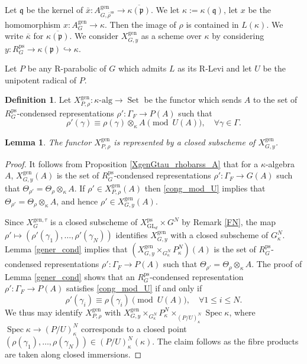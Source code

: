 \documentclass{amsart}
\newtheorem{lem}[prop]{Lemma}
\theoremstyle{definition}
\newtheorem{defi}[prop]{Definition}
\theoremstyle{remark}
\DeclareMathOperator{\GL}{GL}
\DeclareMathOperator{\Spec}{Spec}
\DeclareMathOperator{\Set}{Set}
\newcommand{\pp}{\mathfrak p}
\newcommand{\qq}{\mathfrak{q}}
\newcommand{\alg}{\mathrm{alg}}
\newcommand{\rhobar}{\overline{\rho}}
\newcommand{\ps}{\mathrm{ps}}
\newcommand{\gen}{\mathrm{gen}}
\newcommand{\kappabar}{\overline{\kappa}}
\newcommand{\RpsG}{R^{\ps}_G}
\newcommand{\XpsGLd}{X^{\ps}_{\GL_d}}
\newcommand{\xbar}{\bar{x}}
\newcommand{\rhobarss}{\rhobar^{\mathrm{ss}}}
\newcommand{\hyphen}{\text{-}}
\renewcommand{\xbar}{\bar{x}}
\begin{document}
 Let $\qq$ be the kernel of $\xbar: A^{\gen}_{G, \rhobarss} \rightarrow \overline{\kappa(\pp)}$. We let 
 $\kappa:=\kappa(\qq)$, let $x$ be the homomorphism $x: A^{\gen}_G \rightarrow \kappa$. Then the image of 
 $\rho$ is contained in $L(\kappa)$. 
 We write $\kappabar$ for $\overline{\kappa(\pp)}$. We consider $X^{\gen}_{G, y}$ as a scheme over 
 $\kappa$ by considering $y: R^{\ps}_{G} \rightarrow \kappa(\pp)\hookrightarrow \kappa$.
 
Let $P$ be any R-parabolic of $G$ which admits $L$ as its R-Levi  and let $U$ be the unipotent radical of $P$. 
\begin{defi}\label{def_XgenPrho}  Let $X^{\gen}_{P, \rho}: \kappa\hyphen\alg \to \Set$ be the functor which sends 
$A$ to the set of  $R^{\ps}_{G}$-condensed representations $\rho': \Gamma_F\rightarrow P(A)$ such that 
\begin{equation}\label{cong_mod_U}
\rho'(\gamma)\equiv\rho(\gamma)\otimes_{\kappa} A \pmod{U(A)}, \quad \forall \gamma\in \Gamma.
\end{equation}
\end{defi}

\begin{lem} The functor $X^{\gen}_{P, \rho}$ is represented by a closed subscheme of $X^{\gen}_{G, y}$.
\end{lem} 
\begin{proof} It follows from Proposition \ref{XgenGtau_rhobarss_A} that for a $\kappa$-algebra $A$, 
$X^{\gen}_{G, y}(A)$ is the set of $R^{\ps}_{G}$-condensed representations
$\rho':\Gamma_F\rightarrow G(A)$ such that $\Theta_{\rho'}= \Theta_{\rho}\otimes_{\kappa} A$.
If $\rho'\in X^{\gen}_{P, \rho}(A)$ then \eqref{cong_mod_U} implies that 
$\Theta_{\rho'}= \Theta_{\rho}\otimes_{\kappa} A$, and hence $\rho'\in X^{\gen}_{G, y}(A)$.

Since $X^{\gen,\tau}_G$ is a closed subscheme of $\XpsGLd\times G^N$ by Remark \ref{FN},
the map $\rho' \mapsto (\rho'(\gamma_1), \ldots, \rho'(\gamma_N))$ identifies 
$X^{\gen}_{G, y}$ with a closed subscheme of $G^N_{\kappa}$. Lemma \ref{gener_cond} implies that 
$(X^{\gen}_{G, y}\times_{G^N_{\kappa}} P^N_{\kappa})(A)$ is the set of $R^{\ps}_G$-condensed 
representations $\rho':\Gamma_F \rightarrow P(A)$ such that $\Theta_{\rho'}=\Theta_{\rho} \otimes_{\kappa} A$. The proof of Lemma \ref{gener_cond} shows that an 
$\RpsG$-condensed representation $\rho': \Gamma_F \rightarrow P(A)$ satisfies \eqref{cong_mod_U} 
if and only if 
$$\rho'(\gamma_i)\equiv \rho(\gamma_i)\pmod{U(A)}, \quad \forall 1\le i\le N.$$
We thus may identify $X^{\gen}_{P, \rho}$ with 
$X^{\gen}_{G, y}\times_{G^N_{\kappa}} P^N_{\kappa} \times_{(P/U)_{\kappa}^N} \Spec \kappa$, 
where $\Spec \kappa \rightarrow (P/U)_{\kappa}^N$ corresponds to a closed point 
$(\rho(\gamma_1), \ldots, \rho(\gamma_N))\in (P/U)_{\kappa}^N(\kappa)$. The claim follows as 
the  fibre products are taken along closed immersions. 
\end{proof} 
\end{document}
